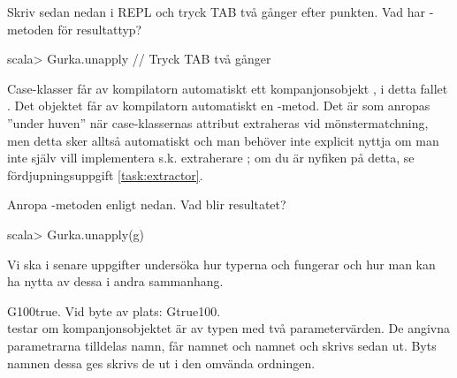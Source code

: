 \Subtask Skriv sedan nedan i REPL och tryck TAB två gånger efter punkten. Vad har -metoden för resultattyp?
\begin{REPL}
scala> Gurka.unapply   // Tryck TAB två gånger
\end{REPL}
\begin{Background}
Case-klasser får av kompilatorn automatiskt ett kompanjonsobjekt , i detta fallet . Det objektet får av kompilatorn automatiskt en -metod. Det är  som anropas ''under huven'' när case-klassernas attribut extraheras vid mönstermatchning, men detta sker alltså automatiskt och man behöver inte explicit nyttja  om man inte själv vill implementera s.k. extraherare ; om du är nyfiken på detta, se fördjupningsuppgift \ref{task:extractor}.
\end{Background}

\Subtask Anropa -metoden enligt nedan. Vad blir resultatet?
\begin{REPL}
scala> Gurka.unapply(g)
\end{REPL}
Vi ska i senare uppgifter undersöka hur typerna  och  fungerar och hur man kan ha nytta av dessa i andra sammanhang.

%

\SOLUTION


\TaskSolved \what


\SubtaskSolved  G100true. Vid byte av plats: Gtrue100.\\
 testar om kompanjonsobjektet  är av typen  med två parametervärden. De angivna parametrarna tilldelas namn,  får namnet  och  namnet  och skrivs sedan ut. Byts namnen dessa ges skrivs de ut i den omvända ordningen.

\SubtaskSolved  {}

\SubtaskSolved	{}


